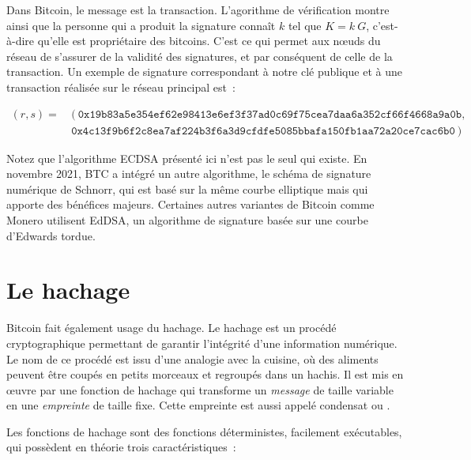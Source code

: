 Dans Bitcoin, le message est la transaction. L'agorithme de vérification montre ainsi que la personne qui a produit la signature connaît $k$ tel que $K = k~G$, c'est-à-dire qu'elle est propriétaire des bitcoins. C'est ce qui permet aux nœuds du réseau de s'assurer de la validité des signatures, et par conséquent de celle de la transaction. Un exemple de signature correspondant à notre clé publique et à une transaction réalisée sur le réseau principal est~:

{ \scriptsize
\begin{align*}
(r, s) = &~(~\mathtt{0x19b83a5e354ef62e98413e6ef3f37ad0c69f75cea7daa6a352cf66f4668a9a0b}, \\
    &~\mathtt{0x4c13f9b6f2c8ea7af224b3f6a3d9cfdfe5085bbafa150fb1aa72a20ce7cac6b0}~)
\end{align*}
}

Notez que l'algorithme ECDSA présenté ici n'est pas le seul qui existe. En novembre 2021, BTC a intégré un autre algorithme, le schéma de signature numérique de Schnorr, qui est basé sur la même courbe elliptique mais qui apporte des bénéfices majeurs. Certaines autres variantes de Bitcoin comme Monero utilisent EdDSA, un algorithme de signature basée sur une courbe d'Edwards tordue.

\section*{Le hachage} %

Bitcoin fait également usage du hachage. Le hachage est un procédé cryptographique permettant de garantir l'intégrité d'une information numérique. Le nom de ce procédé est issu d'une analogie avec la cuisine, où des aliments peuvent être coupés en petits morceaux et regroupés dans un hachis. Il est mis en œuvre par une fonction de hachage qui transforme un \emph{message} de taille variable en une \emph{empreinte} de taille fixe. Cette empreinte est aussi appelé condensat ou .

Les fonctions de hachage sont des fonctions déterministes, facilement exécutables, qui possèdent en théorie trois caractéristiques~:

